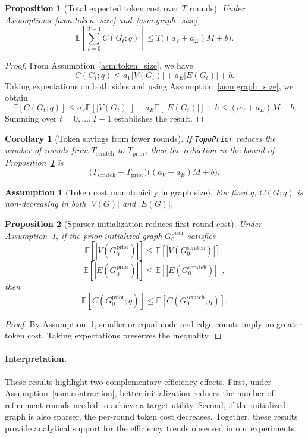 \documentclass[lettersize,journal]{IEEEtran}
\theoremstyle{plain}
\newtheorem{corollary}{Corollary}
\newtheorem{assumption}{Assumption}
\newtheorem{proposition}{Proposition}
\begin{document}
\begin{proposition}[Total expected token cost over $T$ rounds]
\label{prop:token_total}
Under Assumptions~\ref{asm:token_size} and~\ref{asm:graph_size},
\[
\mathbb{E}\!\left[\sum_{t=0}^{T-1} C(G_t; q)\right]
\le
T\bigl((a_V+a_E)M + b\bigr).
\]
\end{proposition}

\begin{proof}
From Assumption~\ref{asm:token_size}, we have
\[
C(G_t; q) \le a_V |V(G_t)| + a_E |E(G_t)| + b.
\]
Taking expectations on both sides and using Assumption~\ref{asm:graph_size}, we obtain
\[
\mathbb{E}[C(G_t; q)]
\le
a_V \mathbb{E}[|V(G_t)|] + a_E \mathbb{E}[|E(G_t)|] + b
\le
(a_V+a_E)M + b.
\]
Summing over $t=0,\dots,T-1$ establishes the result.
\end{proof}

\begin{corollary}[Token savings from fewer rounds]
\label{cor:token_savings}
If \texttt{TopoPrior} reduces the number of rounds from $T_{\mathrm{scratch}}$ to $T_{\mathrm{prior}}$, then the reduction in the bound of Proposition~\ref{prop:token_total} is
\[
\bigl(T_{\mathrm{scratch}} - T_{\mathrm{prior}}\bigr)\bigl((a_V+a_E)M + b\bigr).
\]
\end{corollary}

\begin{assumption}[Token cost monotonicity in graph size]
\label{asm:token_mono}
For fixed $q$, $C(G; q)$ is non-decreasing in both $|V(G)|$ and $|E(G)|$.
\end{assumption}

\begin{proposition}[Sparser initialization reduces first-round cost]
\label{prop:sparsity}
Under Assumption~\ref{asm:token_mono}, if the prior-initialized graph $G_0^{\mathrm{prior}}$ satisfies
\[
\mathbb{E}[|V(G_0^{\mathrm{prior}})|] \le \mathbb{E}[|V(G_0^{\mathrm{scratch}})|],
\]
\[
\mathbb{E}[|E(G_0^{\mathrm{prior}})|] \le \mathbb{E}[|E(G_0^{\mathrm{scratch}})|],
\]
then
\[
\mathbb{E}[C(G_0^{\mathrm{prior}}; q)]
\le
\mathbb{E}[C(G_0^{\mathrm{scratch}}; q)].
\]
\end{proposition}

\begin{proof}
By Assumption~\ref{asm:token_mono}, smaller or equal node and edge counts imply no greater token cost. Taking expectations preserves the inequality.
\end{proof}

\paragraph{Interpretation.}
These results highlight two complementary efficiency effects. First, under Assumption~\ref{asm:contraction}, better initialization reduces the number of refinement rounds needed to achieve a target utility. Second, if the initialized graph is also sparser, the per-round token cost decreases. Together, these results provide analytical support for the efficiency trends observed in our experiments.
\end{document}
